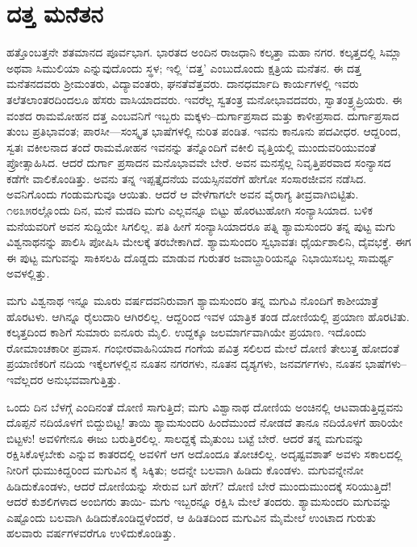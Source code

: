 
\chapter{ದತ್ತ ಮನೆತನ}

\noindent

ಹತ್ತೊಂಬತ್ತನೇ ಶತಮಾನದ ಪೂರ್ವಭಾಗ. ಭಾರತದ ಅಂದಿನ ರಾಜಧಾನಿ ಕಲ್ಕತ್ತಾ ಮಹಾ ನಗರ. ಕಲ್ಕತ್ತದಲ್ಲಿ ಸಿಮ್ಲಾ ಅಥವಾ ಸಿಮುಲಿಯಾ ಎನ್ನುವುದೊಂದು ಸ್ಥಳ; ಇಲ್ಲಿ ‘ದತ್ತ’ ಎಂಬುದೊಂದು ಕ್ಷತ್ರಿಯ ಮನೆತನ. ಈ ದತ್ತ ಮನೆತನದವರು ಶ್ರೀಮಂತರು, ವಿದ್ಯಾವಂತರು, ಘನತೆವೆತ್ತವರು. ದಾನಧರ್ಮಾದಿ ಕಾರ್ಯಗಳಲ್ಲಿ ಇವರು ತಲೆತಲಾಂತರದಿಂದಲೂ ಹೆಸರು ವಾಸಿಯಾದವರು. ಇವರೆಲ್ಲ ಸ್ವತಂತ್ರ ಮನೋಭಾವದವರು, ಸ್ವಾತಂತ್ರ್ಯಪ್ರಿಯರು. ಈ ವಂಶದ ರಾಮಮೋಹನ ದತ್ತ ಎಂಬವನಿಗೆ ಇಬ್ಬರು ಮಕ್ಕಳು–ದುರ್ಗಾಪ್ರಸಾದ ಮತ್ತು ಕಾಳೀಪ್ರಸಾದ. ದುರ್ಗಾಪ್ರಸಾದ ತುಂಬ ಪ್ರತಿಭಾವಂತ; ಪಾರಸೀ—ಸಂಸ್ಕೃತ ಭಾಷೆಗಳಲ್ಲಿ ನುರಿತ ಪಂಡಿತ. ಇವನು ಕಾನೂನು ಪದವೀಧರ. ಆದ್ದರಿಂದ, ಸ್ವತಃ ವಕೀಲನಾದ ತಂದೆ ರಾಮಮೋಹನ ಇವನನ್ನು ತನ್ನೊಂದಿಗೆ ವಕೀಲಿ ವೃತ್ತಿಯಲ್ಲಿ ಮುಂದುವರಿಯುವಂತೆ ಪ್ರೋತ್ಸಾಹಿಸಿದ. ಆದರೆ ದುರ್ಗಾ ಪ್ರಸಾದನ ಮನೊಭಾವವೇ ಬೇರೆ. ಅವನ ಮನಸ್ಸೆಲ್ಲ ನಿವೃತ್ತಿಪರವಾದ ಸಂನ್ಯಾಸದ ಕಡೆಗೇ ವಾಲಿಕೊಂಡಿತ್ತು. ಅವನು ತನ್ನ ಇಪ್ಪತ್ತೈದನೆಯ ವಯಸ್ಸಿನವರೆಗೆ ಹೇಗೋ ಸಂಸಾರಜೀವನ ನಡೆಸಿದ. ಅವನಿಗೊಂದು ಗಂಡುಮಗುವೂ ಆಯಿತು. ಆದರೆ ಆ ವೇಳೆಗಾಗಲೇ ಅವನ ವೈರಾಗ್ಯ ತೀವ್ರವಾಗಿಬಿಟ್ಟಿತು. ೧೮೩೫ರಲ್ಲೊಂದು ದಿನ, ಮನೆ ಮಡದಿ ಮಗು ಎಲ್ಲವನ್ನೂ ಬಿಟ್ಟು ಹೊರಟುಹೋಗಿ ಸಂನ್ಯಾಸಿಯಾದ. ಬಳಿಕ ಮನೆಯವರಿಗೆ ಅವನ ಸುದ್ದಿಯೇ ಸಿಗಲಿಲ್ಲ. ಪತಿ ಹೀಗೆ ಸಂನ್ಯಾಸಿಯಾದರೂ ಪತ್ನಿ ಶ್ಯಾಮಸುಂದರಿ ತನ್ನ ಪುಟ್ಟ ಮಗು ವಿಶ್ವನಾಥನನ್ನು ಪಾಲಿಸಿ ಪೋಷಿಸಿ ಮೇಲಕ್ಕೆ ತರಬೇಕಾಗಿದೆ. ಶ್ಯಾಮಸುಂದರಿ ಸ್ವಭಾವತಃ ಧೈರ್ಯಶಾಲಿನಿ, ದೈವಭಕ್ತೆ. ಈಗ ಈ ಪುಟ್ಟ ಮಗುವನ್ನು ಸಾಕಿಸಲಹಿ ದೊಡ್ಡದು ಮಾಡುವ ಗುರುತರ ಜವಾಬ್ದಾರಿಯನ್ನೂ ನಿಭಾಯಿಸಬಲ್ಲ ಸಾಮರ್ಥ್ಯ ಅವಳಲ್ಲಿತ್ತು.

ಮಗು ವಿಶ್ವನಾಥ ಇನ್ನೂ ಮೂರು ವರ್ಷದವನಿರುವಾಗ ಶ್ಯಾಮಸುಂದರಿ ತನ್ನ ಮಗುವಿ ನೊಂದಿಗೆ ಕಾಶೀಯಾತ್ರೆ ಹೊರಟಳು. ಆಗಿನ್ನೂ ರೈಲುದಾರಿ ಆಗಿರಲಿಲ್ಲ. ಆದ್ದರಿಂದ ಇವಳ ಯಾತ್ರಿಕ ತಂಡ ದೋಣಿಯಲ್ಲಿ ಪ್ರಯಾಣ ಹೊರಟಿತು. ಕಲ್ಕತ್ತದಿಂದ ಕಾಶಿಗೆ ಸುಮಾರು ಐನೂರು ಮೈಲಿ. ಉದ್ದಕ್ಕೂ ಜಲಮಾರ್ಗವಾಗಿಯೇ ಪ್ರಯಾಣ. ಇದೊಂದು ರೋಮಾಂಚಕಾರೀ ಪ್ರವಾಸ. ಗಂಭೀರವಾಹಿನಿಯಾದ ಗಂಗೆಯ ಪವಿತ್ರ ಸಲಿಲದ ಮೇಲೆ ದೋಣಿ ತೇಲುತ್ತ ಹೋದಂತೆ ಪ್ರಯಾಣಿಕರಿಗೆ ನದಿಯ ಇಕ್ಕೆಲಗಳಲ್ಲಿನ ನೂತನ ನಗರಗಳು, ನೂತನ ದೃಶ್ಯಗಳು, ಜನವರ್ಗಗಳು, ನೂತನ ಭಾಷೆಗಳು–ಇವೆಲ್ಲದರ ಅನುಭವವಾಗುತ್ತಿತ್ತು.

ಒಂದು ದಿನ ಬೆಳಗ್ಗೆ ಎಂದಿನಂತೆ ದೋಣಿ ಸಾಗುತ್ತಿದೆ; ಮಗು ವಿಶ್ವಾನಾಥ ದೋಣಿಯ ಅಂಚಿನಲ್ಲಿ ಆಟವಾಡುತ್ತಿದ್ದವನು ದೊಪ್ಪನೆ ನದಿಯೊಳಗೆ ಬಿದ್ದುಬಿಟ್ಟ! ತಾಯಿ ಶ್ಯಾಮಸುಂದರಿ ಹಿಂದೆಮುಂದೆ ನೋಡದೆ ತಾನೂ ನದಿಯೊಳಗೆ ಹಾರಿಯೇ ಬಿಟ್ಟಳು! ಅವಳಿಗೇನೂ ಈಜು ಬರುತ್ತಿರಲಿಲ್ಲ. ಸಾಲದ್ದಕ್ಕೆ ಮೈತುಂಬ ಬಟ್ಟೆ ಬೇರೆ. ಆದರೆ ತನ್ನ ಮಗುವನ್ನು ರಕ್ಷಿಸಿಕೊಳ್ಳಬೇಕು ಎನ್ನುವ ಕಾತರದಲ್ಲಿ ಅವಳಿಗೆ ಆಗ ಅದೊಂದೂ ತೋಚಲಿಲ್ಲ. ಅದೃಷ್ಟವಶಾತ್ ಅವಳು ಸಕಾಲದಲ್ಲಿ ನೀರಿಗೆ ಧುಮುಕಿದ್ದರಿಂದ ಮಗುವಿನ ಕೈ ಸಿಕ್ಕಿತು; ಅದನ್ನೇ ಬಲವಾಗಿ ಹಿಡಿದು ಕೊಂಡಳು. ಮಗುವನ್ನೇನೋ ಹಿಡಿದುಕೊಂಡಳು, ಆದರೆ ದೋಣಿಯನ್ನು ಸೇರುವ ಬಗೆ ಹೇಗೆ? ದೋಣಿ ಬೇರೆ ಮುಂದುಮುಂದಕ್ಕೆ ಸರಿಯುತ್ತಿದೆ! ಆದರೆ ಕುಶಲಿಗಳಾದ ಅಂಬಿಗರು ತಾಯಿ- ಮಗು ಇಬ್ಬರನ್ನೂ ರಕ್ಷಿಸಿ ಮೇಲೆ ತಂದರು. ಶ್ಯಾಮಸುಂದರಿ ಮಗುವನ್ನು ಎಷ್ಟೊಂದು ಬಲವಾಗಿ ಹಿಡಿದುಕೊಂಡಿದ್ದಳೆಂದರೆ, ಆ ಹಿಡಿತದಿಂದ ಮಗುವಿನ ಮೈಮೇಲೆ ಉಂಟಾದ ಗುರುತು ಹಲವಾರು ವರ್ಷಗಳವರೆಗೂ ಉಳಿದುಕೊಂಡಿತ್ತು.

